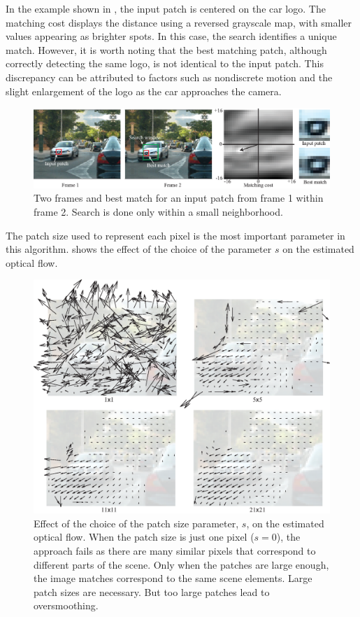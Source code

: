 In the example shown in \fig{\ref{fig:matching_cost_figure}}, the input patch is centered on the car logo. The matching cost displays the distance using a reversed grayscale map, with smaller values appearing as brighter spots. In this case, the search identifies a unique match. However, it is worth noting that the best matching patch, although correctly detecting the same logo, is not identical to the input patch. This discrepancy can be attributed to factors such as nondiscrete motion and the slight enlargement of the logo as the car approaches the camera.


\begin{figure}[h!]
\includegraphics[width=1\linewidth]{figures/optical_flow/matching_cost_figure.eps}
\caption{Two frames and best match for an input patch from frame 1 within frame 2. Search is done only within a small neighborhood.}
\label{fig:matching_cost_figure}
\end{figure}

The patch size used to represent each pixel is the most important parameter in this algorithm. \Fig{\ref{fig:matching_optical_flow_patch_size_effect}} shows the effect of the choice of the parameter $s$ on the estimated optical flow.


\begin{figure}[h!]
\centerline{
\includegraphics[width=.8\linewidth]{figures/optical_flow/matching_optical_flow_patch_size_effect.eps}
}
\caption{Effect of the choice of the patch size parameter, $s$, on the estimated optical flow. When the patch size is just one pixel ($s=0$), the approach fails as there are many similar pixels that correspond to different parts of the scene. Only when the patches are large enough, the image matches correspond to the same scene elements. Large patch sizes are necessary. But too large patches lead to oversmoothing. }
\label{fig:matching_optical_flow_patch_size_effect}
\end{figure}

